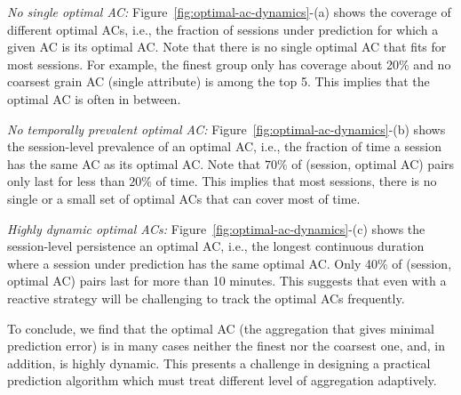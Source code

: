  
\begin{packeditemize}
	\item {\it No single optimal AC:} Figure~\ref{fig:optimal-ac-dynamics}-(a) shows the coverage of different optimal ACs, i.e., the fraction of sessions under prediction for which a given AC is its optimal AC. Note that there is no single optimal AC that fits for most sessions. For example, the finest group only has coverage about 20\% and no coarsest grain AC (single attribute) is among the top 5. This implies that the optimal AC is often in between.
	\item {\it No temporally prevalent optimal AC:} Figure~\ref{fig:optimal-ac-dynamics}-(b) shows the session-level prevalence of an optimal AC, i.e., the fraction of time a session has the same AC as its optimal AC. Note that $70\%$ of (session, optimal AC) pairs only last for less than $20\%$ of time. This implies that most sessions, there is no single or a small set of optimal ACs that can cover most of time.
	\item {\it Highly dynamic optimal ACs:} Figure~\ref{fig:optimal-ac-dynamics}-(c) shows the session-level persistence an optimal AC, i.e., the longest continuous duration where a session under prediction has the same optimal AC. Only 40\% of (session, optimal AC) pairs last for more than 10 minutes. This suggests that even with a reactive strategy will be challenging to track the optimal ACs frequently.
\end{packeditemize}

To conclude, we find that the optimal AC (the aggregation that gives minimal prediction error) is in many cases neither the finest nor the coarsest one, and, in addition, is highly dynamic. This presents a challenge in designing a practical prediction algorithm which must treat different level of aggregation adaptively.


